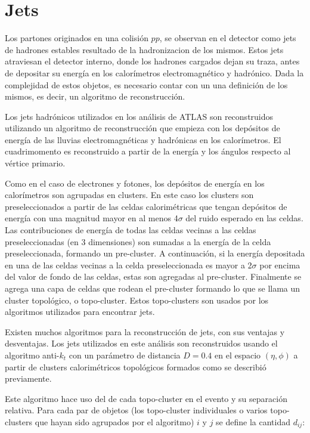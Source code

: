\section{Jets}
\label{sec:jet_obj}

Los partones originados en una colisión $pp$, se observan en el detector como
jets de hadrones estables resultado de la hadronizacion de los mismos. Estos
jets atraviesan el detector interno, donde los hadrones cargados dejan su traza,
antes de depositar su energía en los calorímetros electromagnético y hadrónico.
Dada la complejidad de estos objetos, es necesario contar con un una definición
de los mismos, es decir, un algoritmo de reconstrucción.

Los jets hadrónicos utilizados en los análisis de ATLAS son reconstruidos utilizando
un algoritmo de reconstrucción que empieza con los depósitos de energía de las lluvias
electromagnéticas y hadrónicas en los calorímetros. El cuadrimomento es reconstruido
a partir de la energía y los ángulos respecto al vértice primario.

Como en el caso de electrones y fotones, los depósitos de energía en los
calorímetros son agrupadas en clusters. En este caso los clusters son
preseleccionados a partir de las celdas calorimétricas que tengan depósitos de
energía con una magnitud mayor en al menos 4$\sigma$ del ruido esperado en las
celdas. Las contribuciones de energía de todas las celdas vecinas a las celdas
preseleccionadas (en 3 dimensiones) son sumadas a la energía de la celda
preseleccionada, formando un pre-cluster. A continuación, si la energía
depositada en una de las celdas vecinas a la celda preseleccionada es mayor a
2$\sigma$ por encima del valor de fondo de las celdas, estas son agregadas al
pre-cluster. Finalmente se agrega una capa de celdas que rodean el pre-cluster
formando lo que se llama un cluster topológico, o topo-cluster.
Estos topo-clusters son usados por los algoritmos
utilizados para encontrar jets.

Existen muchos algoritmos para la reconstrucción de jets, con sus ventajas y
desventajas. Los jets utilizados en este análisis son reconstruidos usando el
algoritmo anti-$k_t$\cite{Cacciari:2008gp} con un parámetro de distancia $D =
0.4$ en el espacio $(\eta, \phi)$ a partir de clusters calorimétricos
topológicos\cite{Lampl:1099735} formados como se describió previamente.

Este algoritmo hace uso del {\pt} de cada topo-cluster en el evento y su
separación relativa. Para cada par de objetos (los topo-cluster individuales o
varios topo-clusters que hayan sido agrupados por el algoritmo) $i$ y $j$ se
define la cantidad $d_{ij}$:

